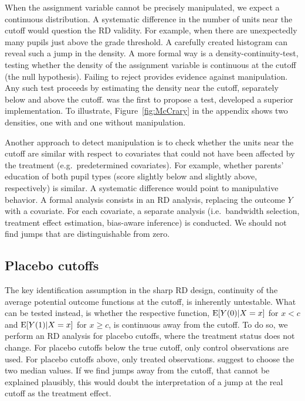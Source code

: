 When the assignment variable cannot be precisely manipulated, we expect a continuous distribution.
A systematic difference in the number of units near the cutoff would question the RD validity.
For example, when there are unexpectedly many pupils just above the grade threshold.
A carefully created histogram can reveal such a jump in the density.
A more formal way is a density-continuity-test, testing whether the density of the assignment variable is continuous at the cutoff 
(the null hypothesis).
Failing to reject provides evidence against manipulation.
Any such test proceeds by estimating the density near the cutoff, separately below and above the cutoff. 
\textcite{McCrary_2008} was the first to propose a test, \textcite{Cattaneo_2020} developed a superior implementation.
To illustrate, Figure~\ref{fig:McCrary} in the appendix shows two densities, one with and one without manipulation.

Another approach to detect manipulation is to check whether the units near the cutoff are similar with respect to covariates
that could not have been affected by the treatment (e.g.\ predetermined covariates).
For example, whether parents' education of both pupil types (score slightly below and slightly above, respectively) is similar.
A systematic difference would point to manipulative behavior.
A formal analysis consists in an RD analysis, replacing the outcome $Y$ with a covariate.   
For each covariate, a separate analysis (i.e.\ bandwidth selection, treatment effect estimation, bias-aware inference) is conducted.
We should not find jumps that are distinguishable from zero.

\subsection{Placebo cutoffs}

The key identification assumption in the sharp RD design, continuity of the average potential outcome functions at the cutoff, is inherently untestable.
What can be tested instead, is whether the respective function, $\operatorname{E}[Y(0) | X=x]$ for $x<c$ and $\operatorname{E}[Y(1) | X=x]$ for $x \geq c$,
is continuous away from the cutoff.
To do so, we perform an RD analysis for placebo cutoffs, where the treatment status does not change.
For placebo cutoffs below the true cutoff, only control observations are used.
For placebo cutoffs above, only treated observations.
\textcite{Imbens_2008} suggest to choose the two median values.  
If we find jumps away from the cutoff, that cannot be explained plausibly,
this would doubt the interpretation of a jump at the real cutoff as the treatment effect.

